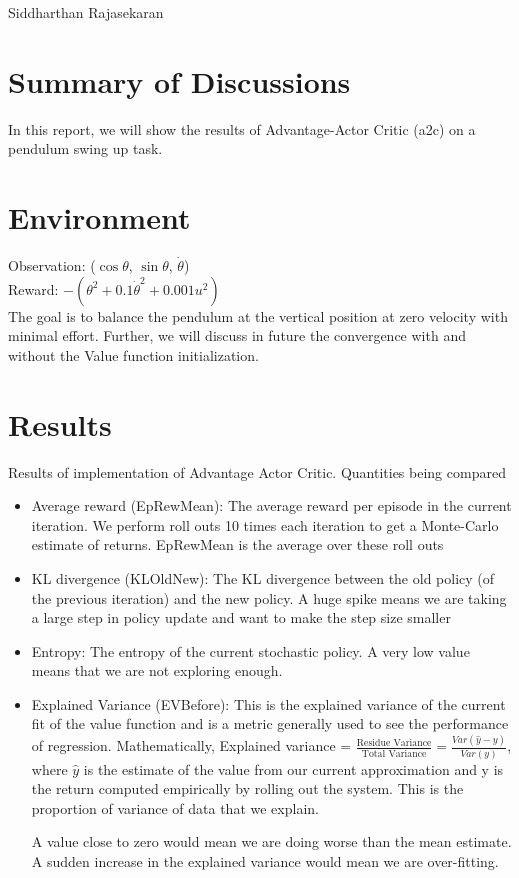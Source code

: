 \documentclass{article}[11pt]
\begin{document}
\begin{center}
Siddharthan Rajasekaran\\

\end{center}

\section{Summary of Discussions}
In this report, we will show the results of Advantage-Actor Critic (a2c) on a pendulum swing up task. 

\section{Environment}
Observation: ($\cos\theta$, $\sin\theta$, $\dot\theta$)\\
Reward: $-(\theta^2 + 0.1\dot\theta^2 + 0.001u^2)$\\

The goal is to balance the pendulum at the vertical position at zero velocity with minimal effort. Further, we will discuss in future the convergence with and without the Value function initialization. 

\section{Results}

Results of implementation of Advantage Actor Critic. Quantities being compared
\begin{itemize}
\item Average reward (EpRewMean): The average reward per episode in the current iteration. We perform roll outs 10 times each iteration to get a Monte-Carlo estimate of returns. EpRewMean is the average over these roll outs
\item KL divergence (KLOldNew): The KL divergence between the old policy (of the previous iteration) and the new policy. A huge spike means we are taking a large step in policy update and want to make the step size smaller
\item Entropy: The entropy of the current stochastic policy. A very low value means that we are not exploring enough.
\item Explained Variance (EVBefore): This is the explained variance of the current fit of the value function and is a metric generally used to see the performance of regression. 
Mathematically, Explained variance = $\frac{\text{Residue Variance}}{\text{Total Variance}} = \frac{Var(\hat{y} - y)}{Var(y)}$, where $\hat{y}$ is the estimate of the value from our current approximation and y is the return computed empirically by rolling out the system. This is the proportion of variance of data that we explain. 

A value close to zero would mean we are doing worse than the mean estimate. A sudden increase in the explained variance would mean we are over-fitting. 

\end{itemize}
\end{document}

